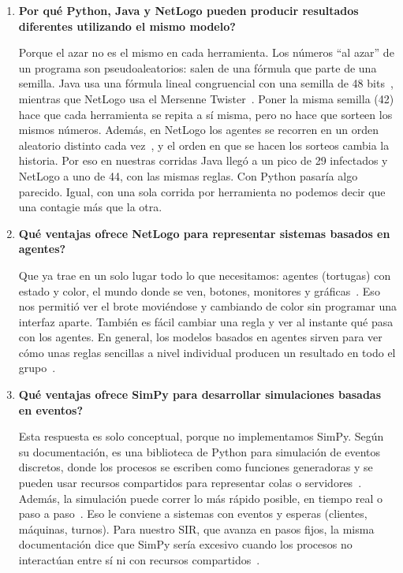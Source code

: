 \documentclass[11pt,a4paper]{article}
\begin{document}
\begin{enumerate}
  \item \textbf{\textquestiondown{}Por qué Python, Java y NetLogo pueden producir resultados diferentes utilizando el mismo modelo?}
  \par Porque el azar no es el mismo en cada herramienta. Los números ``al azar'' de un programa son pseudoaleatorios: salen de una fórmula que parte de una semilla. Java usa una fórmula lineal congruencial con una semilla de 48 bits~\cite{java}, mientras que NetLogo usa el Mersenne Twister~\cite{netlogo}. Poner la misma semilla (42) hace que cada herramienta se repita a sí misma, pero no hace que sorteen los mismos números. Además, en NetLogo los agentes se recorren en un orden aleatorio distinto cada vez~\cite{netlogo}, y el orden en que se hacen los sorteos cambia la historia. Por eso en nuestras corridas Java llegó a un pico de 29 infectados y NetLogo a uno de 44, con las mismas reglas. Con Python pasaría algo parecido. Igual, con una sola corrida por herramienta no podemos decir que una contagie más que la otra.
  \item \textbf{\textquestiondown{}Qué ventajas ofrece NetLogo para representar sistemas basados en agentes?}
  \par Que ya trae en un solo lugar todo lo que necesitamos: agentes (tortugas) con estado y color, el mundo donde se ven, botones, monitores y gráficas~\cite{netlogo}. Eso nos permitió ver el brote moviéndose y cambiando de color sin programar una interfaz aparte. También es fácil cambiar una regla y ver al instante qué pasa con los agentes. En general, los modelos basados en agentes sirven para ver cómo unas reglas sencillas a nivel individual producen un resultado en todo el grupo~\cite{romanowska2021}.
  \item \textbf{\textquestiondown{}Qué ventajas ofrece SimPy para desarrollar simulaciones basadas en eventos?}
  \par Esta respuesta es solo conceptual, porque no implementamos SimPy. Según su documentación, es una biblioteca de Python para simulación de eventos discretos, donde los procesos se escriben como funciones generadoras y se pueden usar recursos compartidos para representar colas o servidores~\cite{simpy}. Además, la simulación puede correr lo más rápido posible, en tiempo real o paso a paso~\cite{simpy}. Eso le conviene a sistemas con eventos y esperas (clientes, máquinas, turnos). Para nuestro SIR, que avanza en pasos fijos, la misma documentación dice que SimPy sería excesivo cuando los procesos no interactúan entre sí ni con recursos compartidos~\cite{simpy}.

\end{enumerate}
\end{document}
